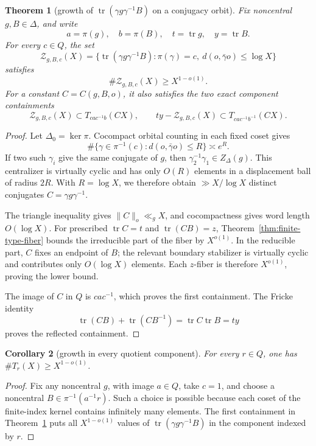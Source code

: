 \documentclass[11pt,reqno]{amsart}
\newtheorem{theorem}{Theorem}[section]
\newtheorem{corollary}[theorem]{Corollary}
\theoremstyle{definition}
\theoremstyle{remark}
\newcommand{\Tr}{\operatorname{tr}}
\begin{document}
\begin{theorem}[growth of \(\Tr(\gamma g\gamma^{-1}B)\) on a conjugacy orbit]
\label{thm:colored-orbit-growth}
Fix noncentral \(g,B\in\Delta\), and write
\[
 a=\pi(g),\quad b=\pi(B),\quad t=\Tr g,\quad y=\Tr B.
\]
For every \(c\in Q\), the set
\[
 \mathcal Z_{g,B,c}(X)=
 \{\Tr(\gamma g\gamma^{-1}B):
       \pi(\gamma)=c,\ d(o,\bar\gamma o)\le\log X\}
\]
satisfies
\[
 \#\mathcal Z_{g,B,c}(X)\ge X^{1-o(1)}.
\]
For a constant \(C=C(g,B,o)\), it also satisfies the two exact component
containments
\[
 \mathcal Z_{g,B,c}(X)\subset T_{cac^{-1}b}(CX),
 \qquad
 ty-\mathcal Z_{g,B,c}(X)\subset T_{cac^{-1}b^{-1}}(CX).
\]
\end{theorem}

\begin{proof}
Let \(\Delta_0=\ker\pi\).  Cocompact orbital counting in each fixed coset
gives
\[
 \#\{\gamma\in\pi^{-1}(c):d(o,\bar\gamma o)\le R\}\asymp e^R.
\]
If two such \(\gamma_i\) give the same conjugate of \(g\), then
\(\gamma_2^{-1}\gamma_1\in Z_\Delta(g)\).  This centralizer is virtually
cyclic and has only \(O(R)\) elements in a displacement ball of radius
\(2R\).  With \(R=\log X\), we therefore obtain \(\gg X/\log X\) distinct
conjugates \(C=\gamma g\gamma^{-1}\).

The triangle inequality gives \(\|C\|_o\ll_gX\), and cocompactness gives
word length \(O(\log X)\).  For prescribed
\(\Tr C=t\) and \(\Tr(CB)=z\), Theorem~\ref{thm:finite-type-fiber} bounds
the irreducible part of the fiber by \(X^{o(1)}\).  In the reducible part,
\(C\) fixes an endpoint of \(B\); the relevant boundary stabilizer is
virtually cyclic and contributes only \(O(\log X)\) elements.  Each
\(z\)-fiber is therefore \(X^{o(1)}\), proving the lower bound.

The image of \(C\) in \(Q\) is \(cac^{-1}\), which proves the first
containment.
The Fricke identity
\[
 \Tr(CB)+\Tr(CB^{-1})=\Tr C\Tr B=ty
\]
proves the reflected containment.
\end{proof}

\begin{corollary}[growth in every quotient component]
\label{cor:colored-growth}
For every \(r\in Q\), one has \(\#T_r(X)\ge X^{1-o(1)}\).
\end{corollary}

\begin{proof}
Fix any noncentral \(g\), with image \(a\in Q\), take \(c=1\), and choose a
noncentral \(B\in\pi^{-1}(a^{-1}r)\).  Such a choice is possible because
each coset of the finite-index kernel contains infinitely many elements.
The first containment in Theorem~\ref{thm:colored-orbit-growth} puts all
\(X^{1-o(1)}\) values of \(\Tr(\gamma g\gamma^{-1}B)\) in the component
indexed by \(r\).
\end{proof}
\end{document}
